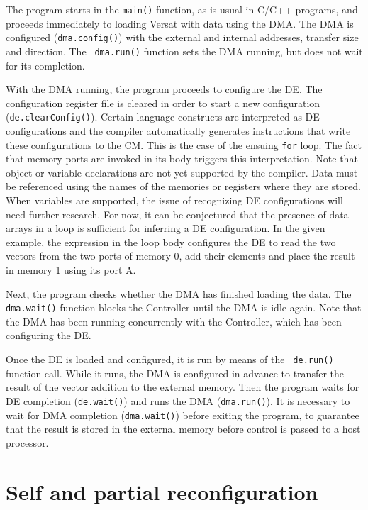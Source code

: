 The program starts in the {\tt main()} function, as is usual in C/C++
programs, and proceeds immediately to loading Versat with data using
the DMA. The DMA is configured ({\tt dma.config()}) with the external
and internal addresses, transfer size and direction. The {\tt
  dma.run()} function sets the DMA running, but does not wait for its
completion.

With the DMA running, the program proceeds to configure the DE. The
configuration register file is cleared in order to start a new
configuration ({\tt de.clearConfig()}). Certain language constructs
are interpreted as DE configurations and the compiler automatically
generates instructions that write these configurations to the CM. This
is the case of the ensuing {\tt for} loop. The fact that memory ports
are invoked in its body triggers this interpretation. Note that object
or variable declarations are not yet supported by the compiler. Data
must be referenced using the names of the memories or registers where
they are stored. When variables are supported, the issue of
recognizing DE configurations will need further research. For now, it
can be conjectured that the presence of data arrays in a loop is
sufficient for inferring a DE configuration. In the given example, the
expression in the loop body configures the DE to read the two vectors
from the two ports of memory 0, add their elements and place the
result in memory 1 using its port A.

Next, the program checks whether the DMA has finished loading the
data. The {\tt dma.wait()} function blocks the Controller until the
DMA is idle again. Note that the DMA has been running concurrently
with the Controller, which has been configuring the DE.

Once the DE is loaded and configured, it is run by means of the {\tt
  de.run()} function call. While it runs, the DMA is configured in
advance to transfer the result of the vector addition to the external
memory. Then the program waits for DE completion ({\tt de.wait()}) and
runs the DMA ({\tt dma.run()}). It is necessary to wait for DMA
completion ({\tt dma.wait()}) before exiting the program, to guarantee
that the result is stored in the external memory before control is
passed to a host processor.

\section{Self and partial reconfiguration}
\label{section:selfPartialReconfiguration}

